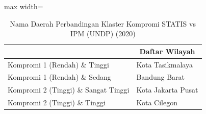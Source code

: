 \begin{table}[H]
\centering
\caption{Nama Daerah Perbandingan Klaster Kompromi STATIS vs IPM (UNDP) (2020)} \label{tab:sample1comp_ipm_name_2020}
\begin{adjustbox}{max width=\textwidth}
\begin{tabular}{|>{\centering\arraybackslash}p{4cm}|p{10cm}|}
\hline
\multicolumn{1}{|c|}{\textbf{Kategori}} & \multicolumn{1}{c|}{\textbf{Daftar Wilayah}} \\
\hline
Kompromi 1 (Rendah) \& Tinggi & Kota Tasikmalaya \\
\hline
Kompromi 1 (Rendah) \& Sedang & Bandung Barat \\
\hline
Kompromi 2 (Tinggi) \& Sangat Tinggi & Kota Jakarta Pusat \\
\hline
Kompromi 2 (Tinggi) \& Tinggi & Kota Cilegon \\
\hline
\end{tabular}
\end{adjustbox}
\end{table}